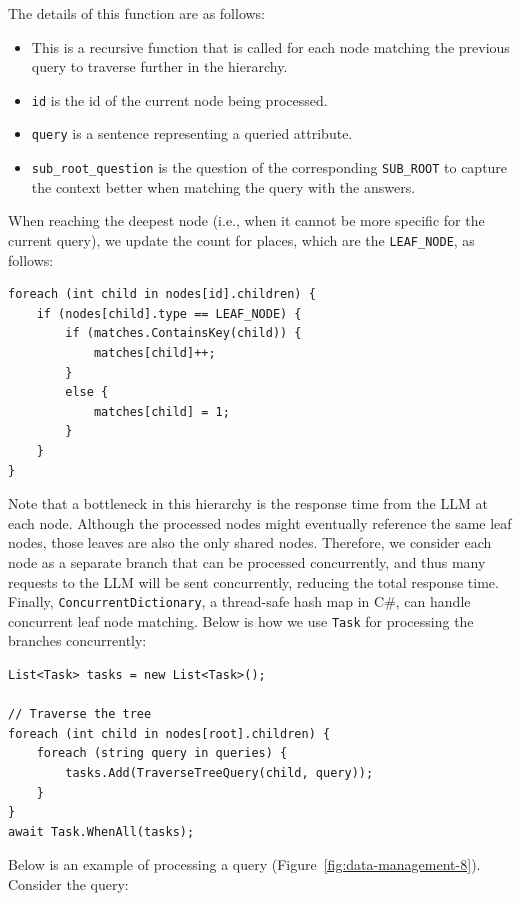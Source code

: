 The details of this function are as follows:
\begin{itemize}
    \item This is a recursive function that is called for each node matching the previous query to traverse further in the hierarchy.
    \item \texttt{id} is the id of the current node being processed.
    \item \texttt{query} is a sentence representing a queried attribute.
    \item \texttt{sub\_root\_question} is the question of the corresponding \texttt{SUB\_ROOT} to capture the context better when matching the query with the answers.
\end{itemize}

When reaching the deepest node (i.e., when it cannot be more specific for the current query), we update the count for places, which are the \texttt{LEAF\_NODE}, as follows:

\begin{lstlisting}[style=cSharp]
foreach (int child in nodes[id].children) {
    if (nodes[child].type == LEAF_NODE) {
        if (matches.ContainsKey(child)) {
            matches[child]++;
        }
        else {
            matches[child] = 1;
        }
    }
}
\end{lstlisting}

Note that a bottleneck in this hierarchy is the response time from the LLM at each node. Although the processed nodes might eventually reference the same leaf nodes, those leaves are also the only shared nodes. Therefore, we consider each node as a separate branch that can be processed concurrently, and thus many requests to the LLM will be sent concurrently, reducing the total response time. Finally, \texttt{ConcurrentDictionary}, a thread-safe hash map in C\#, can handle concurrent leaf node matching. Below is how we use \texttt{Task} for processing the branches concurrently:

\begin{lstlisting}[style=cSharp]
List<Task> tasks = new List<Task>();

// Traverse the tree
foreach (int child in nodes[root].children) {
    foreach (string query in queries) {
        tasks.Add(TraverseTreeQuery(child, query));
    }
}
await Task.WhenAll(tasks);
\end{lstlisting}

Below is an example of processing a query (Figure~\ref{fig:data-management-8}). Consider the query:

